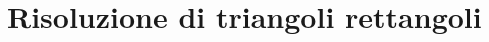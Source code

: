 % 
% 
%  
% 
% 
% 
% 
%  
% 
% 
% 
% 

\section{Risoluzione di triangoli rettangoli}
\label{sec:trigo_triangolirettangoli}


